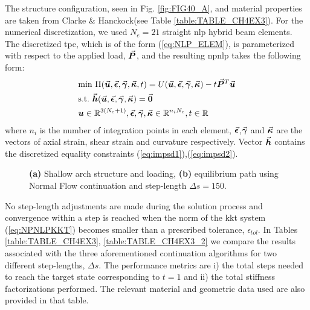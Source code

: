 The structure configuration, seen in Fig. \ref{fig:FIG40_A}, and material 
properties are 
taken from Clarke \& Hanckock\cite{Clarke:1990}(see Table 
\ref{table:TABLE_CH4EX3}). 
For the numerical discretization, we used $N_e=21$ straight \acrshort{nlp} 
hybrid beam elements. The discretized \acrshort{tpe}, which is of the 
form (\ref{eq:NLP_ELEM}), is parameterized with respect to the applied load, 
$\vec{\boldsymbol{P}}$, and the resulting \acrshort{npnlp} takes the following form:
\begin{align}
	&\text{min}\
	\Pi(\bvec{u},\bvec{\epsilon},\bvec{\gamma},\bvec{\kappa},t)=U(\bvec{u},\bvec{\epsilon},
	\bvec{\gamma},\bvec{\kappa})-t\bvec{P}^T\bvec{u}\label{eq:PiEX4}\\
	&\text{s.t.}\ 
	\bvec{h}(\bvec{u},\bvec{\epsilon},\bvec{\gamma},\bvec{\kappa})=\bvec{0}\nonumber\\
	&\bm{u}\in\mathbb{R}^{3(N_e+1)},
	\bvec{\epsilon},\bvec{\gamma},\bvec{\kappa}\in\mathbb{R}^{n_iN_e},
	t\in\mathbb{R}\nonumber
\end{align}
\nonumber where $n_i$ is the number of integration points in each element,
$\vec{\boldsymbol{\epsilon}}$,$\vec{\boldsymbol{\gamma}}$ and $\vec{\boldsymbol{\kappa}}$ are the vectors of axial 
strain,
shear strain and curvature respectively. Vector $\vec{\boldsymbol{h}}$ contains the 
discretized equality constraints (\ref{eq:impsd1}),(\ref{eq:impsd2}).

\begin{figure*}[t]
	\centering
	\qquad
	\caption{\textbf{(a)} Shallow arch structure and loading, \textbf{(b)}
		equilibrium path using Normal Flow continuation and step-length $\Delta 
		s=150$.}%
	\label{fig:FIG40}%
\end{figure*}

No step-length adjustments are made during the solution process and convergence 
within 
a step is reached when the norm of the \acrshort{kkt} system 
(\ref{eq:NPNLPKKT}) becomes smaller than a prescribed tolerance, 
$\epsilon_{tol}$. 
In Tables \ref{table:TABLE_CH4EX3}, \ref{table:TABLE_CH4EX3_2} we compare the 
results associated with the three aforementioned continuation algorithms for 
two different 
step-lengths, $\Delta s$. The performance metrics are i) the total steps needed 
to reach the 
target state corresponding to $t=1$ and ii) the total stiffness 
factorizations performed. The relevant material and geometric
data used are also provided in that table.

